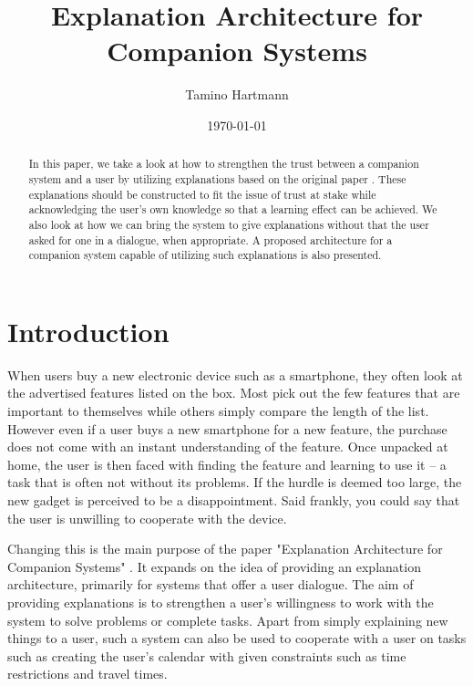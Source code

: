 \documentclass[a4paper]{article}
\begin{document}
\large

\title{Explanation Architecture for Companion Systems}
\author{Tamino Hartmann}
\date{\today}

\maketitle

\begin{abstract}
\normalsize

In this paper, we take a look at how to strengthen the trust between a companion system and a user by utilizing explanations based on the original paper \cite{origin}. These explanations should be constructed to fit the issue of trust at stake while acknowledging the user's own knowledge so that a learning effect can be achieved. We also look at how we can bring the system to give explanations without that the user asked for one in a dialogue, when appropriate. A proposed architecture for a companion system capable of utilizing such explanations is also presented.
\end{abstract}
\newpage

\section{Introduction}

When users buy a new electronic device such as a smartphone, they often look at the advertised features listed on the box. Most pick out the few features that are important to themselves while others simply compare the length of the list. However even if a user buys a new smartphone for a new feature, the purchase does not come with an instant understanding of the feature. Once unpacked at home, the user is then faced with finding the feature and learning to use it – a task that is often not without its problems. If the hurdle is deemed too large, the new gadget is perceived to be a disappointment. Said frankly, you could say that the user is unwilling to cooperate with the device.

Changing this is the main purpose of the paper "Explanation Architecture for Companion Systems" \cite{origin}. It expands on the idea of providing an explanation architecture, primarily for systems that offer a user dialogue. The aim of providing explanations is to strengthen a user's willingness to work with the system to solve problems or complete tasks. Apart from simply explaining new things to a user, such a system can also be used to cooperate with a user on tasks such as creating the user's calendar with given constraints such as time restrictions and travel times.
\end{document}
